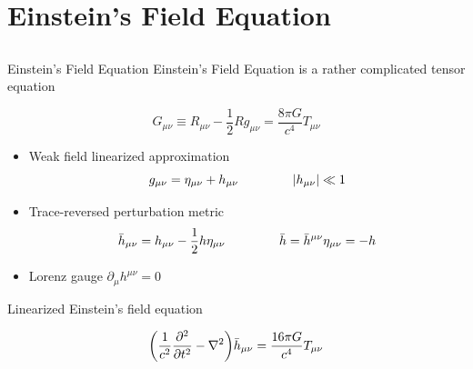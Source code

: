 \documentclass{beamer}
\newcommand{\bea}{\setlength{\jot}{10pt}\begin{eqnarray*}}
\newcommand{\eea}{\end{eqnarray*}}
\theoremstyle{definition}
\theoremstyle{plain}
\begin{document}
\section{Einstein's Field Equation}
\subsection{}
\begin{frame}{Einstein's Field Equation}
	Einstein's Field Equation is a rather complicated tensor equation

	\[
	G_{\mu \nu} \equiv R_{\mu \nu} - \dfrac{1}{2} R g_{\mu \nu} = 
\dfrac{8 \pi G}{c^4} T_{\mu \nu}
	\]
%
\begin{itemize}
\item Weak field linearized approximation
	\[
	g_{\mu \nu} = \eta_{\mu \nu} + h_{\mu \nu} \hspace{1.5cm}
	\abs{h_{\mu \nu}}\ll 1
	\]
\item Trace-reversed perturbation metric
\[
\bar{h} _{\mu \nu} = h_{\mu \nu} - \dfrac{1}{2} h \eta_{\mu \nu} \hspace{1.5cm} \bar{h}=\bar{h}^{\mu \nu} \eta_{\mu \nu} = - h
\]
\item Lorenz gauge $\partial_{\mu} h^{\mu \nu}=0$\\ 
\vspace{0.5cm}
\end{itemize}

Linearized Einstein's field equation

\[
\qty(
\dfrac{1}{c^{2}}
\pdv[2]{}{t}
-
\nabla ^{2}
)
\bar{h} _{\mu \nu} =\dfrac{16 \pi G}{c^{4}} T_{\mu \nu}
\]

\end{frame}
\end{document}
